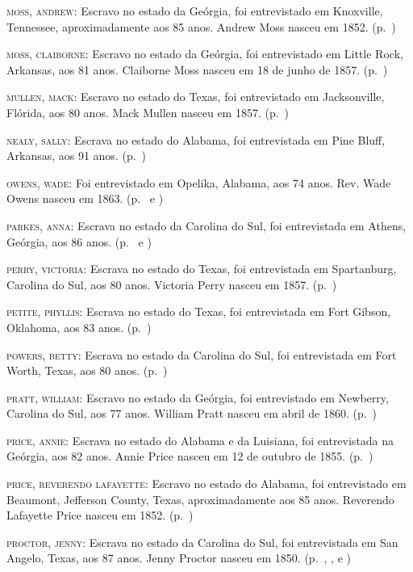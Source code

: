 \begin{Parskip}
\textsc{moss, andrew:} Escravo no estado da Geórgia, foi entrevistado em
Knoxville, Tennessee, aproximadamente aos 85 anos. Andrew Moss nasceu em
1852. (p.~\pageref{ref202})

\textsc{moss, claiborne:} Escravo no estado da Geórgia, foi entrevistado
em Little Rock, Arkansas, aos 81 anos. Claiborne Moss nasceu em 18 de
junho de 1857. (p.~\pageref{ref203})

\textsc{mullen, mack:} Escravo no estado do Texas, foi entrevistado em
Jacksonville, Flórida, aos 80 anos. Mack Mullen nasceu em 1857. (p.~\pageref{ref204})

\textsc{nealy, sally:} Escrava no estado do Alabama, foi entrevistada em
Pine Bluff, Arkansas, aos 91 anos. (p.~\pageref{ref205})

\textsc{owens, wade:} Foi entrevistado em Opelika, Alabama, aos 74 anos.
Rev. Wade Owens nasceu em 1863. (p.~\pageref{ref206} e \pageref{ref207})

\textsc{parkes, anna:} Escrava no estado da Carolina do Sul, foi
entrevistada em Athens, Geórgia, aos 86 anos. (p.~\pageref{ref208} e \pageref{ref209})

\textsc{perry, victoria:} Escrava no estado do Texas, foi entrevistada
em Spartanburg, Carolina do Sul, aos 80 anos. Victoria Perry nasceu em
1857. (p.~\pageref{ref210})

\textsc{petite, phyllis:} Escrava no estado do Texas, foi entrevistada
em Fort Gibson, Oklahoma, aos 83 anos. (p.~\pageref{ref211})

\textsc{powers, betty:} Escrava no estado da Carolina do Sul, foi
entrevistada em Fort Worth, Texas, aos 80 anos. (p.~\pageref{ref212})

\textsc{pratt, william:} Escravo no estado da Geórgia, foi entrevistado
em Newberry, Carolina do Sul, aos 77 anos. William Pratt nasceu em abril
de 1860. (p.~\pageref{ref213})

\textsc{price, annie:} Escrava no estado do Alabama e da Luisiana, foi
entrevistada na Geórgia, aos 82 anos. Annie Price nasceu em 12 de
outubro de 1855. (p.~\pageref{ref214})

\textsc{price, reverendo lafayette:} Escravo no estado do Alabama, foi
entrevistado em Beaumont, Jefferson County, Texas, aproximadamente aos
85 anos. Reverendo Lafayette Price nasceu em 1852. (p.~\pageref{ref215})

\textsc{proctor, jenny:} Escrava no estado da Carolina do Sul, foi
entrevistada em San Angelo, Texas, aos 87 anos. Jenny Proctor nasceu em
1850. (p.~\pageref{ref216}, \pageref{ref217}, \pageref{ref218} e \pageref{ref219})


\end{Parskip}
